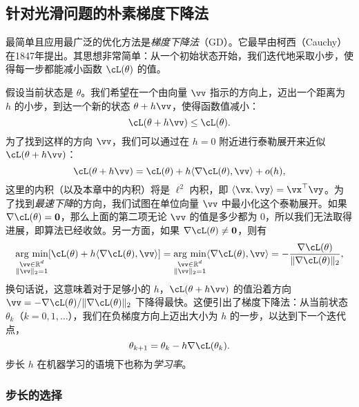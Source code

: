 \documentclass[../../book-main_zh.tex]{subfiles}
\begin{document}
\subsection{针对光滑问题的朴素梯度下降法}

最简单且应用最广泛的优化方法是\textit{梯度下降法}（GD）。它最早由柯西（Cauchy）在1847年提出。其思想非常简单：从一个初始状态开始，我们迭代地采取小步，使得每一步都能减小函数 \(\cL(\theta)\) 的值。

假设当前状态是 \(\theta\)。我们希望在一个由向量 \(\vv\) 指示的方向上，迈出一个距离为 \(h\) 的小步，到达一个新的状态 \(\theta + h\vv\)，使得函数值减小：
\begin{equation}
    \cL(\theta + h\vv) \leq \cL(\theta).
\end{equation}
为了找到这样的方向 \(\vv\)，我们可以通过在 \(h = 0\) 附近进行泰勒展开来近似 \(\cL(\theta + h\vv)\)：
\begin{equation}
    \cL(\theta + h\vv) = \cL(\theta) + h\ip{\nabla \cL(\theta)}{\vv} + o(h),
\end{equation}
这里的内积（以及本章中的内积）将是 \(\ell^{2}\) 内积，即 \(\ip{\vx}{\vy} = \vx^{\top}\vy\)。为了找到\textit{最速下降}的方向，我们试图在单位向量 \(\vv\) 中最小化这个泰勒展开。如果 \(\nabla \cL(\theta) = \vzero\)，那么上面的第二项无论 \(\vv\) 的值是多少都为 \(0\)，所以我们无法取得进展，即算法已经收敛。另一方面，如果 \(\nabla \cL(\theta) \neq \vzero\)，则有
\begin{equation}\label{eq:steepest_descent_l2_norm}
    \argmin_{\substack{\vv \in \R^{d} \\ \norm{\vv}_{2} = 1}} [\cL(\theta) + h\ip{\nabla \cL(\theta)}{\vv}] = \argmin_{\substack{\vv \in \R^{d} \\ \norm{\vv}_{2} = 1}} \ip{\nabla \cL(\theta)}{\vv} = -\frac{\nabla \cL(\theta)}{\norm{\nabla \cL(\theta)}_{2}},
\end{equation}
换句话说，这意味着对于足够小的 \(h\)，\(\cL(\theta + h\vv)\) 的值沿着方向 \(\vv = -\nabla \cL(\theta) / \norm{\nabla \cL(\theta)}_{2}\) 下降得最快。这便引出了梯度下降法：从当前状态 \(\theta_k\)（\(k=0, 1, \ldots\)），我们在负梯度方向上迈出大小为 \(h\) 的一步，以达到下一个迭代点，
\begin{equation}
    \theta_{k+1} = \theta_k - h \nabla \cL(\theta_k). 
\end{equation}
步长 \(h\) 在机器学习的语境下也称为\textit{学习率}。

\subsubsection{步长的选择}
\end{document}
